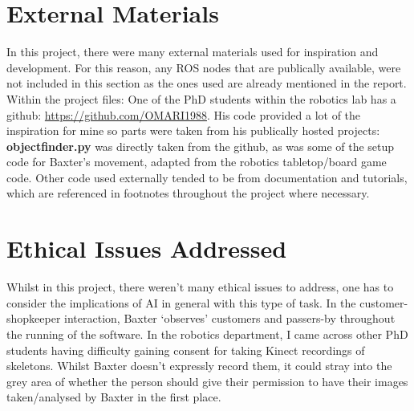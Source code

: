 \begin{appendices}
\let\cleardoublepage\clearpage
\chapter{External Materials}
In this project, there were many external materials used for inspiration and development. For this reason, any ROS nodes that are publically available, were not included in this section as the ones used are already mentioned in the report.
\newline\newline
Within the project files:\newline\newline
One of the PhD students within the robotics lab has a github: \url{https://github.com/OMARI1988}. His code provided a lot of the inspiration for mine so parts were taken from his publically hosted projects: \textbf{objectfinder.py} was directly taken from the github, as was some of the setup code for Baxter's movement, adapted from the robotics tabletop/board game code.\newline\newline
Other code used externally tended to be from documentation and tutorials, which are referenced in footnotes throughout the project where necessary.
\chapter{Ethical Issues Addressed}
Whilst in this project, there weren't many ethical issues to address, one has to consider the implications of AI in general with this type of task. In the customer-shopkeeper interaction, Baxter `observes' customers and passers-by throughout the running of the software. In the robotics department, I came across other PhD students having difficulty gaining consent for taking Kinect recordings of skeletons. Whilst Baxter doesn't expressly record them, it could stray into the grey area of whether the person should give their permission to have their images taken/analysed by Baxter in the first place.
\end{appendices}